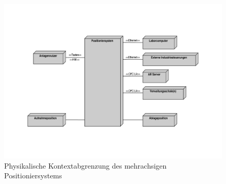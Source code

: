 \documentclass[../Bachelorarbeit.tex]{subfiles}
\begin{document}
\begin{figure}[h]
    \centering
    \includegraphics[width=\textwidth]{Images/phys_abgrenzung.pdf}
    \caption[Physikalische Kontextabgrenzung]{Physikalische Kontextabgrenzung des mehrachsigen Positioniersystems}
    \label{fig:my-img2}
\end{figure}
\end{document}
